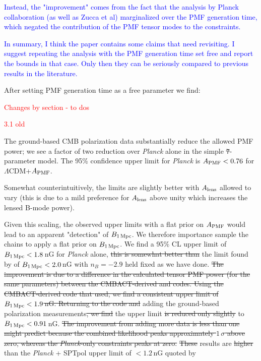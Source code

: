 \documentclass{article}
\newcommand{\apmf}{\ensuremath{A_{\rm PMF}}}
\newcommand{\bpmf}{\ensuremath{B_{\rm 1\,Mpc}}}
\newcommand{\alens}{\ensuremath{A_{\rm lens}}}
\newcommand{\lcdm}{\ensuremath{\Lambda}CDM}
\newcommand{\planck}{{\sl Planck}}
\newcommand{\sptpol}{SPTpol}
\newcommand{\changed}[1]{\textcolor{Red}{#1}}
\newcommand{\removed}[1]{\st{#1}}
\newcommand{\reviewer}[1]{\textcolor{Blue}{#1}}
\newcommand{\diff}[1]{\textcolor{PineGreen}{#1}}
\begin{document}
\reviewer{Instead, the "improvement" comes from the fact that the analysis by Planck collaboration (as well as Zucca et al) marginalized over the PMF generation time, which negated the contribution of the PMF tensor modes to the constraints.}

\reviewer{In summary, I think the paper contains some claims that need revisiting. I suggest repeating the analysis with the PMF generation time set free and report the bounds in that case. Only then they can be seriously compared to previous results in the literature.}

After setting PMF generation time as a free parameter we find:

\diff{}


\changed{Changes by section - to dos}

\changed{3.1 old}

The ground-based CMB polarization data  substantially reduce the allowed PMF power; we see a factor of two reduction over \planck{} alone in the simple \removed{7}-parameter model. 
The 95\% confidence upper limit for \planck{} is $\apmf <  \upperAplk$ for \lcdm{}+\apmf{}.

Somewhat counterintuitively, the limits are slightly better with \alens{} allowed to vary (this is due to a mild preference for \alens{} above unity which increases the lensed B-mode power). 

Given this scaling, the observed upper limits with a flat prior on \apmf{} would lead to an apparent "detection" of \bpmf. 
We therefore importance sample the chains to apply a flat prior on \bpmf. 
We find a 95\% CL upper limit of $\bpmf < \upperBplk$\,nG for \planck{} alone,
\removed{this is somewhat better than} the limit found by \citet{planck15-19} of $\bpmf < 2.0$\,nG with $n_B=-2.9$ held fixed as we have done. 
\removed{The improvement is due to a difference in the calculated tensor PMF power (for the same parameters) between the CMBACT-derived and \mbox{\citet{zucca16}} codes.
Using the CMBACT-derived code that \mbox{\citet{planck15-19}} used, we find a consistent upper limit of $\bpmf < 1.9$\,nG. 
Returning to the \mbox{\citet{zucca16}} code and} adding the ground-based polarization measurements\removed{, we find} the upper limit \removed{is  reduced only slightly} to $\bpmf < \upperBall$\,nG. 
\removed{The improvement from adding more data is less than one might predict because the combined likelihood peaks approximately $1\,\sigma$ above zero, whereas the \planck{}-only constraints peaks at zero. }
\removed{These} results are \removed{higher} than the \planck{} + \sptpol{} upper limit of $<1.2\,$nG quoted by \citet{zucca16}
\end{document}
